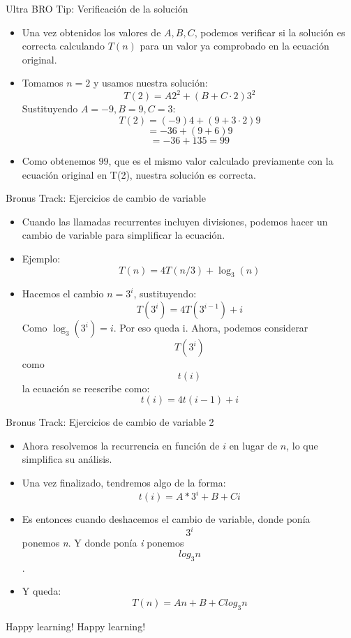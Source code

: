 \documentclass[aspectratio=169]{beamer}
\begin{document}
\begin{frame}{Ultra BRO Tip: Verificación de la solución}
\begin{itemize}
    \item Una vez obtenidos los valores de \( A, B, C \), podemos verificar si la solución es correcta calculando \( T(n) \) para un valor ya comprobado en la ecuación original.
    
    \item Tomamos \( n = 2 \) y usamos nuestra solución:
    \[
    T(2) = A 2^2 + (B + C \cdot 2) 3^2
    \]
    Sustituyendo \( A = -9, B = 9, C = 3 \):
    \[
    T(2) = (-9) 4 + (9 + 3 \cdot 2) 9
    \]
    \[
    = -36 + (9 + 6) 9
    \]
    \[
    = -36 + 135 = 99
    \]
    
    \item Como obtenemos \( 99 \), que es el mismo valor calculado previamente con la ecuación original en T(2), nuestra solución es correcta.
\end{itemize}
\end{frame}


\begin{frame}{Bronus Track: Ejercicios de cambio de variable}
\begin{itemize}
    \item Cuando las llamadas recurrentes incluyen divisiones, podemos hacer un cambio de variable para simplificar la ecuación.
    \item Ejemplo: 
    \[
    T(n) = 4T(n/3) + \log_3(n)
    \]
    
    \item Hacemos el cambio \( n = 3^i \), sustituyendo:
    \[
    T(3^i) = 4T(3^{i-1}) + i
    \]
    Como \( \log_3(3^i) = i \). Por eso queda i. Ahora, podemos considerar \[T(3^i)\] como \[t(i)\] la ecuación se reescribe como:
    \[
    t(i) = 4t(i-1) + i
    \]
    
    
\end{itemize}
\end{frame}

\begin{frame}{Bronus Track: Ejercicios de cambio de variable 2}
\begin{itemize}
   \item Ahora resolvemos la recurrencia en función de \( i \) en lugar de \( n \), lo que simplifica su análisis.
   \item Una vez finalizado, tendremos algo de la forma:
   \[t(i) = A*3^i + B + Ci\]
   \item  Es entonces cuando deshacemos el cambio de variable, donde ponía \[3^i\] ponemos \textit{n}. Y donde ponía \textit{i} ponemos \[log_3n\].
   \item Y queda: \[T(n) = An + B + Clog_3n\]
\end{itemize}
\end{frame}

\begin{frame}{Happy learning!}
Happy learning!
\end{frame}
\end{document}
